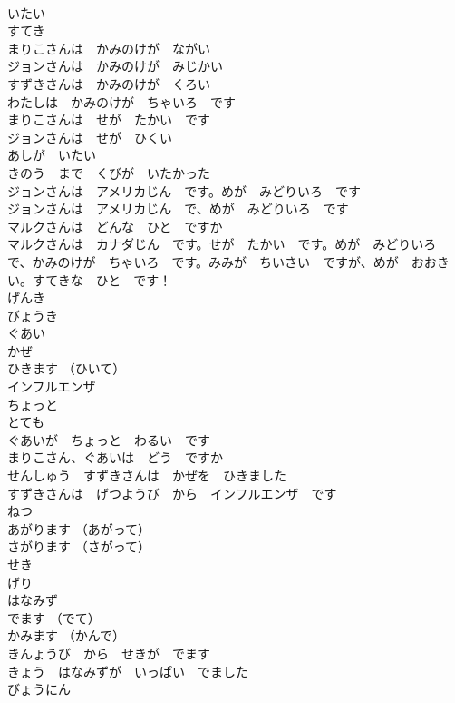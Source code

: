 \documentclass[8pt]{extreport}
\begin{document}
\begin{CJK}{UTF8}{min}
\\	いたい	
\\	すてき	
\\	まりこさんは　かみのけが　ながい	
\\	ジョンさんは　かみのけが　みじかい	
\\	すずきさんは　かみのけが　くろい	
\\	わたしは　かみのけが　ちゃいろ　です	
\\	まりこさんは　せが　たかい　です	
\\	ジョンさんは　せが　ひくい	
\\	あしが　いたい	
\\	きのう　まで　くびが　いたかった	
\\	ジョンさんは　アメリカじん　です。めが　みどりいろ　です	
\\	ジョンさんは　アメリカじん　で、めが　みどりいろ　です	
\\	マルクさんは　どんな　ひと　ですか	
\\	マルクさんは　カナダじん　です。せが　たかい　です。めが　みどりいろ　で、かみのけが　ちゃいろ　です。みみが　ちいさい　ですが、めが　おおきい。すてきな　ひと　です！	
\\	げんき	
\\	びょうき	
\\	ぐあい	
\\	かぜ	
\\	ひきます （ひいて）	
\\	インフルエンザ	
\\	ちょっと	
\\	とても	
\\	ぐあいが　ちょっと　わるい　です	
\\	まりこさん、ぐあいは　どう　ですか	
\\	せんしゅう　すずきさんは　かぜを　ひきました	
\\	すずきさんは　げつようび　から　インフルエンザ　です	
\\	ねつ	
\\	あがります （あがって）	
\\	さがります （さがって）	
\\	せき	
\\	げり	
\\	はなみず	
\\	でます （でて）	
\\	かみます （かんで）	
\\	きんょうび　から　せきが　でます	
\\	きょう　はなみずが　いっぱい　でました	
\\	びょうにん	

\end{CJK}
\end{document}
